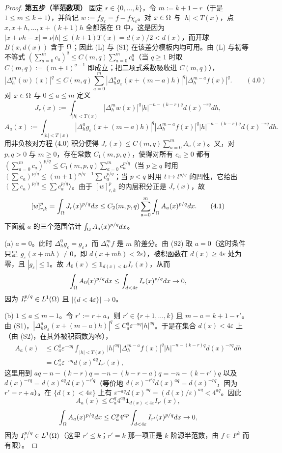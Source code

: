 \begin{proof}
\textbf{第五步（半范数项）} 固定 $r \in \{0,\dots,k\}$，令 $m := k+1-r$（于是 $1 \le m \le k+1$），并简记 $w := f g_\varepsilon = f - f \chi_\varepsilon$。对 $x \in \Omega$ 与 $|h| < T(x)$，点 $x, x+h, \dots, x+(k+1)h$ 全都落在 $\Omega$ 中，这是因为 $|x+\nu h - x| = \nu|h| \le (k+1)T(x) = d(x)/2 < d(x)$，而开球 $B(x,d(x))$ 含于 $\Omega$；因此 (L) 与 (S1) 在该差分模板内均可用。由 (L) 与初等不等式 $(\sum_{a=0}^{m} c_a)^q \le C(m,q) \sum_{a=0}^{m} c_a^q$（当 $q \ge 1$ 时取 $C(m,q) := (m+1)^{q-1}$ 即成立；把二项式系数吸收进 $C(m,q)$），
\[
|\Delta_h^m(w)(x)|^q \le C(m,q) \sum_{a=0}^{m} |\Delta_h^a g_\varepsilon(x+(m-a)h)|^q |\Delta_h^{m-a}f(x)|^q. \qquad (4.0)
\]
对 $x \in \Omega$ 与 $0 \le a \le m$ 定义
\[
J_r(x) := \int_{|h|<T(x)} |\Delta_h^m w(x)|^q |h|^{-n-(k-r)q} d(x)^{-rq} dh,
\]
\[
A_a(x) := \int_{|h|<T(x)} |\Delta_h^a g_\varepsilon(x+(m-a)h)|^q |\Delta_h^{m-a}f(x)|^q |h|^{-n-(k-r)q} d(x)^{-rq} dh.
\]
用非负核对方程 (4.0) 积分便得 $J_r(x) \le C(m,q) \sum_{a=0}^{m} A_a(x)$。又，对 $p, q > 0$ 与 $m \ge 0$，存在常数 $C_1(m,p,q)$，使得对所有 $c_a \ge 0$ 都有 $(\sum_{a=0}^{m} c_a)^{p/q} \le C_1(m,p,q) \sum_{a=0}^{m} c_a^{p/q}$（当 $p \ge q$ 时用 $(\sum c_a)^{p/q} \le (m+1)^{p/q-1} \sum c_a^{p/q}$；当 $p < q$ 时用 $t \mapsto t^{p/q}$ 的凹性，它给出 $(\sum c_a)^{p/q} \le \sum c_a^{p/q}$）。由于 $[w]_{r,k}^{p}$ 的内层积分正是 $J_r(x)$，故
\[
[w]_{r,k}^p = \int_\Omega J_r(x)^{p/q} dx \le C_2(m,p,q) \sum_{a=0}^{m} \int_\Omega A_a(x)^{p/q} dx. \qquad (4.1)
\]
下面就 $a$ 的三个范围估计 $\int_\Omega A_a(x)^{p/q} dx$。

(a) $a = 0$。此时 $\Delta_h^0 g_\varepsilon = g_\varepsilon$，而 $\Delta_h^m f$ 是 $m$ 阶差分。由 (S2) 取 $a = 0$（这时条件只是 $g_\varepsilon(x+mh) \ne 0$，即 $d(x+mh) < 2 \varepsilon$），被积函数在 $d(x) \ge 4 \varepsilon$ 处为零，且 $|g_\varepsilon| \le 1$。故 $A_0(x) \le \mathbf{1}_{d(x)<4\varepsilon} I_r(x)$，从而
\[
\int_\Omega A_0(x)^{p/q} dx \le \int_{d<4\varepsilon} I_r(x)^{p/q} dx \to 0,
\]
因为 $I_r^{p/q} \in L^1(\Omega)$ 且 $|\{d<4\varepsilon\}| \to 0$。

(b) $1 \le a \le m-1$。令 $r' := r+a$，则 $r' \in \{r+1,\dots,k\}$ 且 $m-a = k+1-r'$。由 (S1)，$|\Delta_h^a g_\varepsilon(x+(m-a)h)|^q \le C_a^q \varepsilon^{-aq} |h|^{aq}$。于是在集合 $d(x) < 4 \varepsilon$ 上（由 (S2)，在其外被积函数为零），
\[
\begin{aligned}
A_a(x) &\le C_a^q \varepsilon^{-aq} \int_{|h|<T(x)} |h|^{aq} |\Delta_h^{m-a}f(x)|^q |h|^{-n-(k-r)q} d(x)^{-rq} dh \\
&= C_a^q \varepsilon^{-aq} d(x)^{aq} I_{r'}(x),
\end{aligned}
\]
这里用到 $aq - n - (k-r)q = -n - (k-r-a)q = -n-(k-r')q$ 以及 $d(x)^{-rq} = d(x)^{aq} d(x)^{-r'q}$（等价地 $d(x)^{-r'q} d(x)^{aq} = d(x)^{-rq}$，因为 $r' = r+a$）。在 $\{d(x) < 4 \varepsilon\}$ 上有 $\varepsilon^{-aq} d(x)^{aq} = (d(x)/\varepsilon)^{aq} < 4^{aq}$。因此
\[
A_a(x) \le C_a^q 4^{aq} \mathbf{1}_{d(x)<4\varepsilon} I_{r'}(x),
\]
\[
\int_\Omega A_a(x)^{p/q} dx \le C_a^p 4^{ap} \int_{d<4\varepsilon} I_{r'}(x)^{p/q} dx \to 0,
\]
因为 $I_{r'}^{p/q} \in L^1(\Omega)$（这里 $r' \le k$；$r'=k$ 那一项正是 $k$ 阶源半范数，由 $f \in F^k$ 而有限）。


\end{proof}
